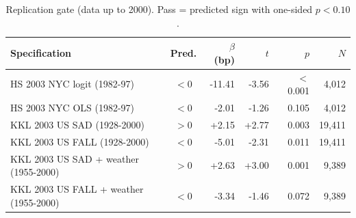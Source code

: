 \begin{table}[htbp]\centering\footnotesize
\caption{Replication gate (data up to 2000). Pass = predicted sign with one-sided $p<0.10$.}
\label{tab:replication}
\begin{tabular}{lcrrrr}\toprule
Specification & Pred. & $\beta$ (bp) & $t$ & $p$ & $N$ \\ \midrule
HS 2003 NYC logit (1982-97) & $<$0 & -11.41 & -3.56 & $<$0.001 & 4,012 \\
HS 2003 NYC OLS (1982-97) & $<$0 & -2.01 & -1.26 & 0.105 & 4,012 \\
KKL 2003 US SAD (1928-2000) & $>$0 & +2.15 & +2.77 & 0.003 & 19,411 \\
KKL 2003 US FALL (1928-2000) & $<$0 & -5.01 & -2.31 & 0.011 & 19,411 \\
KKL 2003 US SAD + weather (1955-2000) & $>$0 & +2.63 & +3.00 & 0.001 & 9,389 \\
KKL 2003 US FALL + weather (1955-2000) & $<$0 & -3.34 & -1.46 & 0.072 & 9,389 \\
\bottomrule\end{tabular}\end{table}
